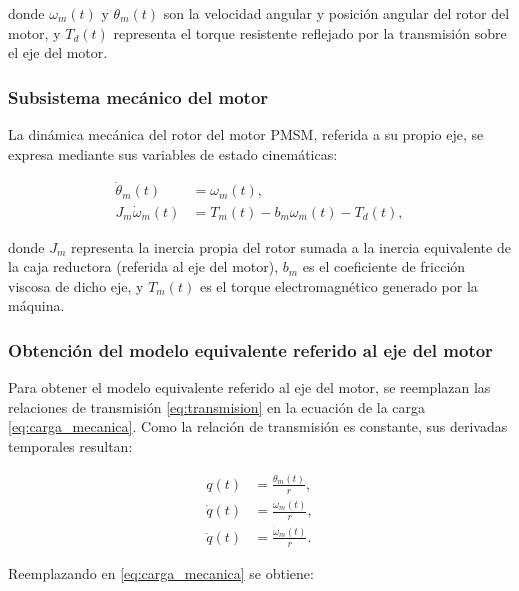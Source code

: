 \documentclass[10pt,a4paper]{article}
\begin{document}
donde \(\omega_m(t)\) y \(\theta_m(t)\) son la velocidad angular y posición angular del rotor del motor,
y $T_d(t)$ representa el torque resistente reflejado por la transmisión sobre el eje del motor.

\subsubsection{Subsistema mecánico del motor}

La dinámica mecánica del rotor del motor PMSM, referida a su propio eje, se expresa mediante sus variables de estado cinemáticas:

\begin{equation}
    \begin{aligned}
        \dot{\theta}_m(t) &= \omega_m(t), \\
        J_m \dot{\omega}_m(t) &= T_m(t) - b_m \omega_m(t) - T_d(t),
    \end{aligned}
    \label{eq:mecanica_motor}
\end{equation}

donde $J_m$ representa la inercia propia del rotor sumada a la inercia equivalente de la caja reductora (referida al eje del motor), 
$b_m$ es el coeficiente de fricción viscosa de dicho eje, 
y $T_m(t)$ es el torque electromagnético generado por la máquina.

\subsubsection{Obtención del modelo equivalente referido al eje del motor}

Para obtener el modelo equivalente referido al eje del motor, se reemplazan las relaciones de transmisión \eqref{eq:transmision} 
en la ecuación de la carga \eqref{eq:carga_mecanica}. Como la relación de transmisión es constante, sus derivadas temporales resultan:

\begin{equation*}
    \begin{aligned}
        q(t) &= \frac{\theta_m(t)}{r}, \\
        \dot{q}(t) &= \frac{\omega_m(t)}{r}, \\
        \ddot{q}(t) &= \frac{\dot{\omega}_m(t)}{r}.
    \end{aligned}
\end{equation*}

Reemplazando en \eqref{eq:carga_mecanica} se obtiene:
\end{document}
